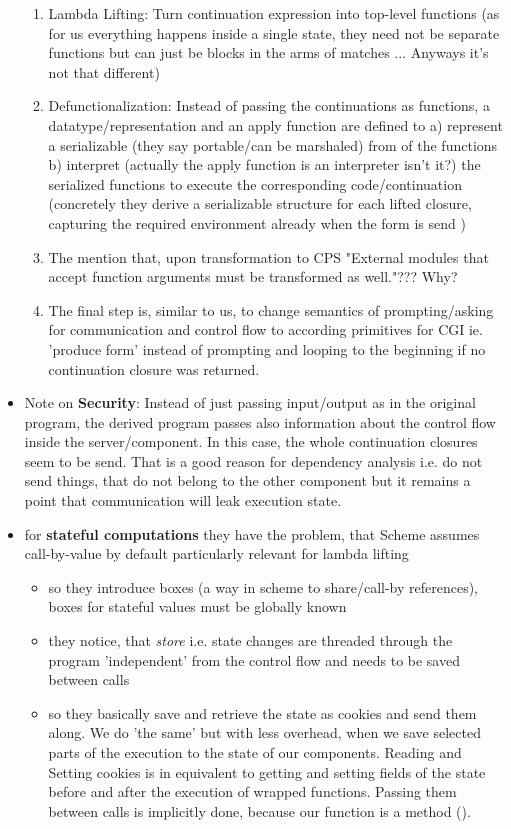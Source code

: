 \begin{itemize}
\begin{enumerate}
        \item Lambda Lifting: Turn continuation expression into top-level functions (as for us everything happens inside a single state, they need not be separate functions but can just be blocks in the arms of matches ... Anyways it's not that different)
        \item Defunctionalization: Instead of passing the continuations as functions, a datatype/representation and an apply function are defined to a) represent a serializable (they say portable/can be marshaled) from of the functions b) interpret (actually the apply function is an interpreter isn't it?) the serialized functions to execute the corresponding code/continuation (concretely they derive a serializable structure for each lifted closure, capturing the required environment already when the form is send )
        \item[] The mention that, upon transformation to CPS "External modules that accept function arguments must be transformed as well."??? Why?
        \item The final step is, similar to us, to change semantics of prompting/asking for communication and control flow to according primitives for CGI ie. 'produce form' instead of prompting and looping to the beginning  if no continuation closure was returned.
    \end{enumerate}
    \item Note on \textbf{Security}: Instead of just passing input/output as in the original program, the derived program passes also information about the control flow inside the server/component. In this case, the whole continuation closures seem to be send. \means That is a good reason for dependency analysis i.e. do not send things, that do not belong to the other component \means but it remains a point that communication will leak execution state.
    \item for \textbf{stateful computations} they have the problem, that Scheme assumes call-by-value by default \means particularly relevant for lambda lifting
    \begin{itemize}
        \item so they introduce boxes (a way in scheme to share/call-by references), boxes for stateful values must be globally known
        \item they notice, that \emph{store} i.e. state changes are threaded through the program 'independent' from the control flow and needs to be saved between calls 
        \item so they basically save and retrieve the state as cookies and send them along. \means We do 'the same' but with less overhead, when we save selected parts of the execution to the state of our components. Reading and Setting cookies is in equivalent to getting and setting fields of the state before and after the execution of wrapped functions. Passing them between calls is implicitly done, because our  function is a method ().

\end{itemize}
\end{itemize}
